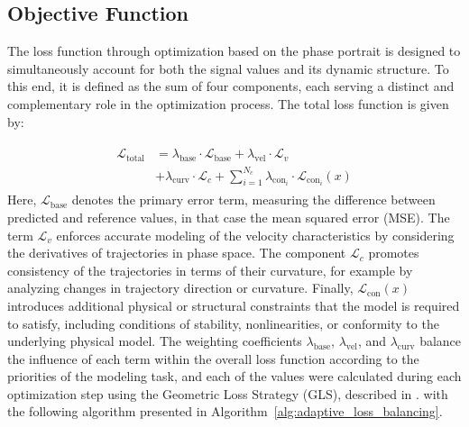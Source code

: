 \documentclass[lettersize,journal]{IEEEtran}
\begin{document}
\subsection{Objective Function}
\noindent The loss function through optimization based on the phase portrait is designed to simultaneously account for both the  signal values and its dynamic structure. To this end, it is defined as the sum of four components, each serving a distinct and complementary role in the optimization process. The total loss function is given by:

\begin{align}
  \begin{split}
    \mathcal{L}_{\mathrm{total}} & = \lambda_{\mathrm{base}} \cdot \mathcal{L}_{\mathrm{base}} + \lambda_{\mathrm{vel}} \cdot \mathcal{L}_{v} \\ &+ \lambda_{\mathrm{curv}} \cdot \mathcal{L}_{c} + \sum^{N_c}_{i=1} \lambda_{\mathrm{con}_i} \cdot \mathcal{L}_{\mathrm{con}_i}(x)
    \label{eq:loss_function}
  \end{split}
\end{align}
Here, \(\mathcal{L}_{\mathrm{base}}\) denotes the primary error term,  measuring the difference between predicted and reference values, in that case the mean squared error (MSE). The term \(\mathcal{L}_{v}\) enforces accurate modeling of the velocity characteristics by considering the derivatives of trajectories in phase space. The component \(\mathcal{L}_{c}\) promotes consistency of the trajectories in terms of their curvature, for example by analyzing changes in trajectory direction or curvature. Finally, \(\mathcal{L}_{\mathrm{con}}(x)\) introduces additional physical or structural constraints that the model is required to satisfy, including conditions of stability, nonlinearities, or conformity to the underlying physical model. The weighting coefficients \(\lambda_{\mathrm{base}}\), \(\lambda_{\mathrm{vel}}\),  and \(\lambda_{\mathrm{curv}}\) balance the influence of each term within the overall loss function according to the priorities of the modeling task, and each of the values were calculated during each optimization step using the Geometric Loss Strategy (GLS), described in \cite{Cipolla2018, Chen2018}. with the following algorithm presented in Algorithm~\ref{alg:adaptive_loss_balancing}.
\end{document}
